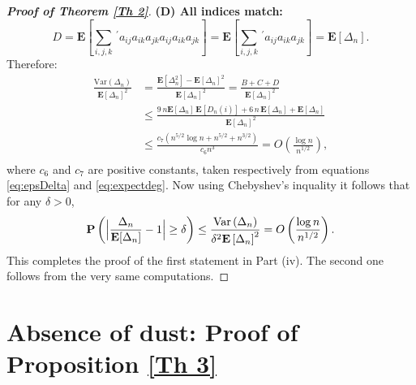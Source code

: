 \documentclass[11pt, reqno]{amsart}
\numberwithin{equation}{section}
\renewcommand{\O}[1]{O\left(#1\right)}
\theoremstyle{plain} %
\theoremstyle{definition} %
\newcommand{\prob}{\mathbf{P}}
\newcommand{\E}{\mathbf{E}}
\begin{document}
\begin{proof}[{\bf Proof of Theorem \ref{Th 2}}]
\textbf{(D) All indices match:}
\begin{equation}
  D=  \mathbf{E}\left[ \sum_{i,j,k}\,^{'}      a_{ij} a_{ik} a_{jk} a_{ij} a_{ik} a_{jk} \right] = \mathbf{E}\left[ \sum_{i,j,k}\,^{'}      a_{ij} a_{ik} a_{jk}  \right] =  \mathbf{E}\left[   \Delta_n \right].
\end{equation}
Therefore:
\begin{equation}
\begin{split}
    \frac{\mathrm{Var}\left(\Delta_n\right) }{\mathbf{E}\left[\Delta_n\right]^2 } &= \frac{\mathbf{E}\left[\Delta_n^2\right] - \mathbf{E}\left[\Delta_n\right]^2 }{\mathbf{E}\left[\Delta_n\right]^2 } = \frac{B+C+D}{\mathbf{E}\left[\Delta_n\right]^2 } \\
    &\leq \frac{ 9 \,n  \mathbf{E}\left[   \Delta_n \right]  \, \mathbf{E}\left[   D_n(i) \right]  + 6 \, n \,   \mathbf{E}\left[   \Delta_n  \right]  + \mathbf{E}\left[   \Delta_n \right] }{\mathbf{E}\left[   \Delta_n \right] ^2}\\
    &\le \frac{ c_7 (n^{5/2}
     \log n   + n^{5/2}  + n^{3/2})
 }{  c_6 n^3}= \O{\frac{\log n}{n^{1/2}}},\\
\end{split}
\end{equation}
where $c_6$ and $c_7$ are positive constants, taken respectively  from equations \eqref{eq:epsDelta} and \eqref{eq:expectdeg}. Now using Chebyshev's inquality it follows that for any $\delta>0$,
$$\prob\left( \Big{|}\frac{ \Delta_n}{\E[ \Delta_n]}-1\Big{|}\ge \delta\right)\le   \frac{\mathrm{Var}\left(\Delta_n\right) }{\delta^2\mathbf{E}\left[\Delta_n\right]^2 }= \O{\frac{\log n}{n^{1/2}}}.$$
This completes the proof of the first statement in Part (iv). The second one follows from the very same computations.


\end{proof}



\section{Absence of dust: Proof of Proposition \ref{Th 3}}\label{Proof: Th 3}
\end{document}

